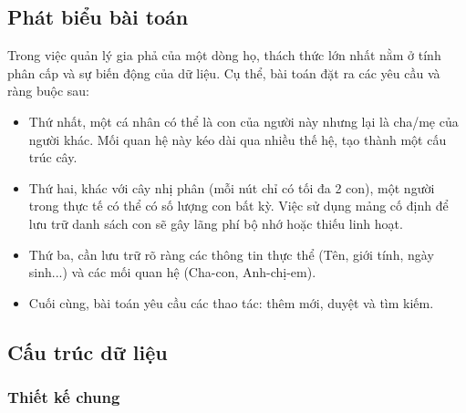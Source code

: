 \subsection{Phát biểu bài toán}
Trong việc quản lý gia phả của một dòng họ, thách thức lớn nhất nằm ở tính phân cấp và sự biến động của dữ liệu. Cụ thể, bài toán đặt ra các yêu cầu và ràng buộc sau:
\begin{itemize}
	\item Thứ nhất, một cá nhân có thể là con của người này nhưng lại là cha/mẹ của người khác. Mối quan hệ này kéo dài qua nhiều thế hệ, tạo thành một cấu trúc cây.
	\item Thứ hai, khác với cây nhị phân (mỗi nút chỉ có tối đa 2 con), một người trong thực tế có thể có số lượng con bất kỳ. Việc sử dụng mảng cố định để lưu trữ danh sách con sẽ gây lãng phí bộ nhớ hoặc thiếu linh hoạt.
	\item Thứ ba, cần lưu trữ rõ ràng các thông tin thực thể (Tên, giới tính, ngày sinh...) và các mối quan hệ (Cha-con, Anh-chị-em).
	\item Cuối cùng, bài toán yêu cầu các thao tác: thêm mới, duyệt và tìm kiếm.
\end{itemize}
\subsection{Cấu trúc dữ liệu}
\subsubsection{Thiết kế chung}

